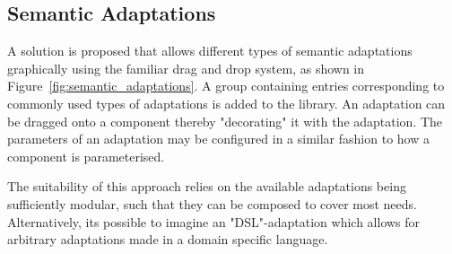 \subsection{Semantic Adaptations}\label{ssec:semantic_adaptations}


A solution is proposed that allows different types of semantic adaptations graphically using the familiar drag and drop system, as shown in Figure~\ref{fig:semantic_adaptations}.
A group containing entries corresponding to commonly used types of adaptations is added to the library.
An adaptation can be dragged onto a component thereby "decorating" it with the adaptation.
The parameters of an adaptation may be configured in a similar fashion to how a component is parameterised.

The suitability of this approach relies on the available adaptations being sufficiently modular, such that they can be composed to cover most needs.
Alternatively, its possible to imagine an "DSL"-adaptation which allows for arbitrary adaptations made in a domain specific language.




